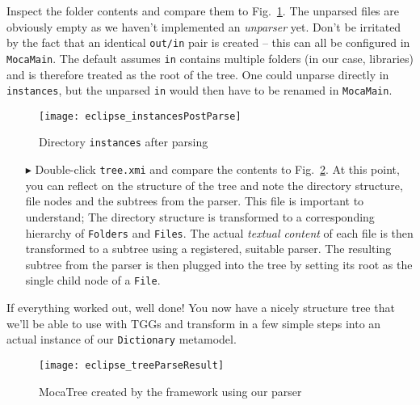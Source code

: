 \newpage

Inspect the folder contents and compare them to Fig.~\ref{eclipse_postParse}. The unparsed files are obviously empty as we haven't implemented an
\emph{unparser} yet. Don't be irritated by the fact that an identical \texttt{out/in} pair is created -- this can all be configured in \texttt{MocaMain}. The
default assumes \texttt{in} contains multiple folders (in our case, libraries) and is therefore treated as the root of the tree. One could unparse directly in
\texttt{instances}, but the unparsed \texttt{in} would then have to be renamed in \texttt{MocaMain}.

\vspace{0.5cm}

\begin{figure}[!htbp]
\begin{center}
 \texttt{[image: eclipse\_instancesPostParse]}
  \caption{Directory \texttt{instances} after parsing}
  \label{eclipse_postParse}
\end{center}
\end{figure} 

\begin{enumerate}

\item[$\blacktriangleright$] Double-click \texttt{tree.xmi} and compare the contents to Fig.~\ref{eclipse:treeResult}. At this point, you can reflect on the
structure of the tree and note the directory structure, file nodes and the subtrees from the parser. This file is important to understand; The directory
structure is transformed to a corresponding hierarchy of \texttt{Folders} and \texttt{Files}. The actual \emph{textual content} of each file is then transformed
to a subtree using a registered, suitable parser. The resulting subtree from the parser is then plugged into the tree by setting its root as the single child
node of a \texttt{File}.

\end{enumerate}

If everything worked out, well done! You now have a nicely structure tree that we'll be able to use with TGGs and transform in a few simple steps into an actual
instance of our \texttt{Dictionary} metamodel.

\newpage

\vspace*{2cm}

\begin{figure}[!htbp]
\begin{center}
 \texttt{[image: eclipse\_treeParseResult]}
  \caption{MocaTree created by the framework using our parser}
  \label{eclipse:treeResult}
\end{center}
\end{figure}

